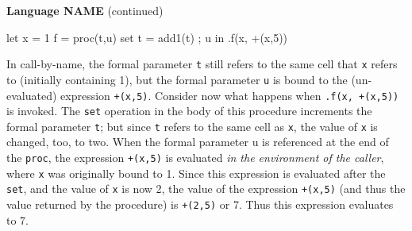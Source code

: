 \begin{minipage}[t]{\sw}
\slidenumber
\LARGE
{\bf Language {\color{red} NAME}} (continued)
\Large
\begin{qv}
let
  x = 1
  f = proc(t,u)
        {
          set t = add1(t) ;
          u
        }
in
  .f(x, +(x,5))
\end{qv}
\LARGE
In call-by-name, the formal parameter \verb't' still refers
to the same cell that \verb'x' refers to (initially containing 1),
but the formal parameter \verb'u' is bound
to the (un-evaluated) expression \verb'+(x,5)'.\exx
Consider now what happens when \verb'.f(x, +(x,5))' is invoked.
The \verb'set' operation in the body of this procedure
increments the formal parameter \verb't';
but since \verb't' refers to the same cell as \verb'x',
the value of \verb'x' is changed, too, to two.
When the formal parameter u is referenced at the end of the \verb'proc',
the expression \verb'+(x,5)' is evaluated
{\em in the environment of the caller},
where \verb'x' was originally bound to 1.
Since this expression is evaluated after the \verb'set',
and the value of \verb'x' is now 2,
the value of the expression \verb'+(x,5)'
(and thus the value returned by the procedure)
is \verb'+(2,5)' or 7.
Thus this expression evaluates to 7.
\end{minipage}
